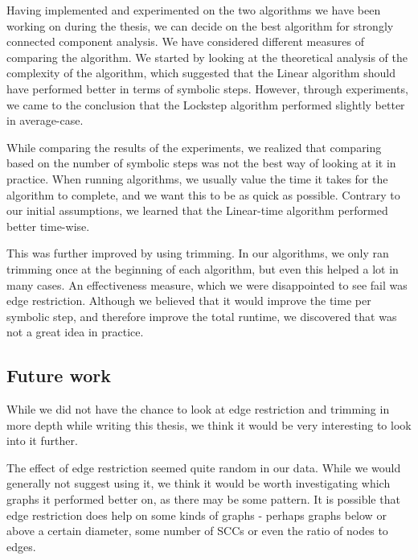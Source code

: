 \documentclass[../master/master.tex]{subfiles}
\begin{document}
Having implemented and experimented on the two algorithms we have been working on during the thesis, we can decide on the best algorithm for strongly connected component analysis. We have considered different measures of comparing the algorithm. We started by looking at the theoretical analysis of the complexity of the algorithm, which suggested that the Linear algorithm should have performed better in terms of symbolic steps. However, through experiments, we came to the conclusion that the Lockstep algorithm performed slightly better in average-case.

While comparing the results of the experiments, we realized that comparing based on the number of symbolic steps was not the best way of looking at it in practice. When running algorithms, we usually value the time it takes for the algorithm to complete, and we want this to be as quick as possible. Contrary to our initial assumptions, we learned that the Linear-time algorithm performed better time-wise.

This was further improved by using trimming. In our algorithms, we only ran trimming once at the beginning of each algorithm, but even this helped a lot in many cases. An effectiveness measure, which we were disappointed to see fail was edge restriction. Although we believed that it would improve the time per symbolic step, and therefore improve the total runtime, we discovered that was not a great idea in practice.


\subsection{Future work}
While we did not have the chance to look at edge restriction and trimming in more depth while writing this thesis, we think it would be very interesting to look into it further.

The effect of edge restriction seemed quite random in our data. While we would generally not suggest using it, we think it would be worth investigating which graphs it performed better on, as there may be some pattern. It is possible that edge restriction does help on some kinds of graphs - perhaps graphs below or above a certain diameter, some number of SCCs or even the ratio of nodes to edges.
\end{document}
